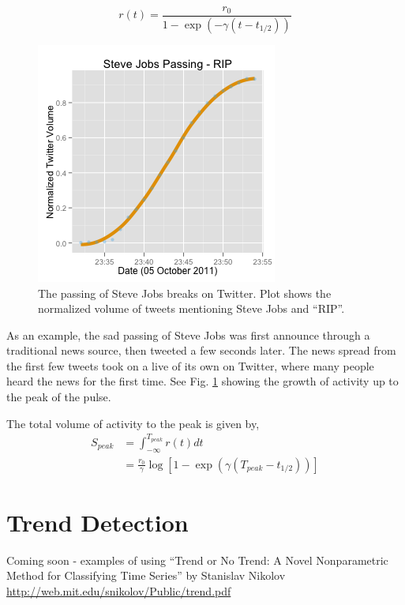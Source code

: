 \documentclass{article}
\begin{document}
\begin{equation}
r(t) = \frac{r_0}{1-\exp(-\gamma (t - t_{1/2}))}
\label{eq:sigmoid}
\end{equation}

\begin{figure}[ht]
\includegraphics[width=2.8 in]{img/jobs_whtppr.png}
\caption{The passing of Steve Jobs breaks on Twitter. Plot shows the normalized volume of tweets mentioning Steve Jobs and ``RIP''.}
\label{fig:jobs}
\end{figure}

As an example, the sad passing of Steve Jobs was first announce through a traditional news source, then tweeted a few seconds later.  The news spread from the first few tweets took on a live of its own on Twitter, where many people heard the news for the first time.  See 
Fig. \ref{fig:jobs} showing the growth of activity up to the peak of the pulse.

The total volume of activity to the peak is given by,
\begin{eqnarray}
S_{peak} &= \int_{-\infty}^{T_{peak}} r(t) dt \\
 &= \frac{r_0}{\gamma} \log[1-\exp(\gamma (T_{peak} - t_{1/2}))]
\label{eq:mass}
\end{eqnarray}

\section{Trend Detection}
\label{sec:trenddetect}

Coming soon - examples of using ``Trend or No Trend: A Novel Nonparametric Method for Classifying Time Series'' by Stanislav Nikolov
\url{http://web.mit.edu/snikolov/Public/trend.pdf}
\end{document}
